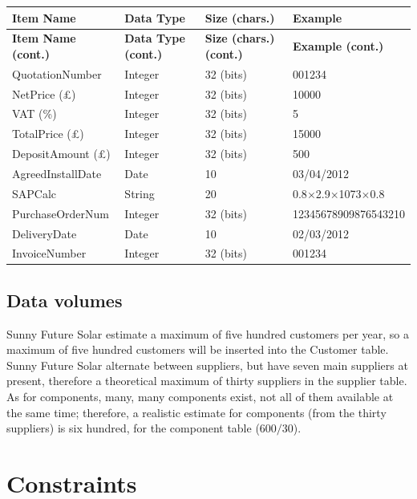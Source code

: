 \begin{center}
	\begin{longtable}{ | p{4cm} | p{4cm} | p{4cm} | p{4cm} | }
		\hline
		\textbf{Item Name} & \textbf{Data Type} & \textbf{Size
(chars.)} & \textbf{Example}\\
		\endfirsthead
		\hline
		\textbf{Item Name (cont.)} & \textbf{Data Type (cont.)} &
\textbf{Size (chars.) (cont.)} & \textbf{Example (cont.)}\\
		\endhead
		\hline
		QuotationNumber & Integer & 32 (bits) & 001234\\
		\hline
		NetPrice (\pounds) & Integer & 32 (bits) & 10000\\
		\hline
		VAT (\%) & Integer & 32 (bits) & 5\\
		\hline
		TotalPrice (\pounds) & Integer & 32 (bits) & 15000\\
		\hline
		DepositAmount (\pounds) & Integer & 32 (bits) & 500\\
		\hline
		AgreedInstallDate & Date & 10 & 03/04/2012\\
		\hline
		SAPCalc\footnotemark & String & 20 & 0.8$\times$2.9$\times$1073$\times$0.8\\
		\hline
		PurchaseOrderNum & Integer & 32 (bits) & 12345678909876543210\\
		\hline
		DeliveryDate & Date & 10 & 02/03/2012\\
		\hline
		InvoiceNumber & Integer & 32 (bits) & 001234\\
		\hline
	\end{longtable}
\end{center}
		\subsection{Data volumes}
		
Sunny Future Solar estimate a maximum of five hundred customers per year, so a maximum of five hundred customers will be inserted into the Customer table.  Sunny Future Solar alternate between suppliers, but have seven main suppliers at present, therefore a theoretical maximum of thirty suppliers in the supplier table.  As for components, many, many components exist, not all of them available at the same time; therefore, a realistic estimate for components (from the thirty suppliers) is six hundred, for the component table (600$/$30).
	\section{Constraints}
